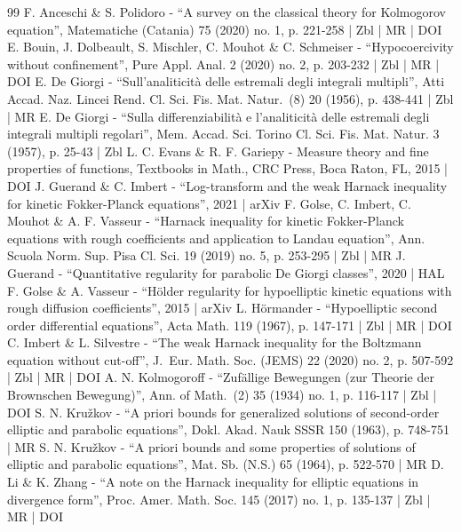 \begin{thebibliography}{99}
F. Anceschi \& S. Polidoro - “A survey on the classical theory for Kolmogorov equation”, Matematiche (Catania) 75 (2020) no. 1, p. 221-258 | Zbl | MR | DOI
E. Bouin, J. Dolbeault, S. Mischler, C. Mouhot \& C. Schmeiser - “Hypocoercivity without confinement”, Pure Appl. Anal. 2 (2020) no. 2, p. 203-232 | Zbl | MR | DOI
E. De Giorgi - “Sull’analiticità delle estremali degli integrali multipli”, Atti Accad. Naz. Lincei Rend. Cl. Sci. Fis. Mat. Natur. (8) 20 (1956), p. 438-441 | Zbl | MR
E. De Giorgi - “Sulla differenziabilità e l’analiticità delle estremali degli integrali multipli regolari”, Mem. Accad. Sci. Torino Cl. Sci. Fis. Mat. Natur. 3 (1957), p. 25-43 | Zbl
L. C. Evans \& R. F. Gariepy - Measure theory and fine properties of functions, Textbooks in Math., CRC Press, Boca Raton, FL, 2015 | DOI
J. Guerand \& C. Imbert - “Log-transform and the weak Harnack inequality for kinetic Fokker-Planck equations”, 2021 | arXiv
F. Golse, C. Imbert, C. Mouhot \& A. F. Vasseur - “Harnack inequality for kinetic Fokker-Planck equations with rough coefficients and application to Landau equation”, Ann. Scuola Norm. Sup. Pisa Cl. Sci. 19 (2019) no. 5, p. 253-295 | Zbl | MR
J. Guerand - “Quantitative regularity for parabolic De Giorgi classes”, 2020 | HAL
F. Golse \& A. Vasseur - “Hölder regularity for hypoelliptic kinetic equations with rough diffusion coefficients”, 2015 | arXiv
L. Hörmander - “Hypoelliptic second order differential equations”, Acta Math. 119 (1967), p. 147-171 | Zbl | MR | DOI
C. Imbert \& L. Silvestre - “The weak Harnack inequality for the Boltzmann equation without cut-off”, J. Eur. Math. Soc. (JEMS) 22 (2020) no. 2, p. 507-592 | Zbl | MR | DOI
A. N. Kolmogoroff - “Zufällige Bewegungen (zur Theorie der Brownschen Bewegung)”, Ann. of Math. (2) 35 (1934) no. 1, p. 116-117 | Zbl | DOI
S. N. Kružkov - “A priori bounds for generalized solutions of second-order elliptic and parabolic equations”, Dokl. Akad. Nauk SSSR 150 (1963), p. 748-751 | MR
S. N. Kružkov - “A priori bounds and some properties of solutions of elliptic and parabolic equations”, Mat. Sb. (N.S.) 65 (1964), p. 522-570 | MR
D. Li \& K. Zhang - “A note on the Harnack inequality for elliptic equations in divergence form”, Proc. Amer. Math. Soc. 145 (2017) no. 1, p. 135-137 | Zbl | MR | DOI

\end{thebibliography}
